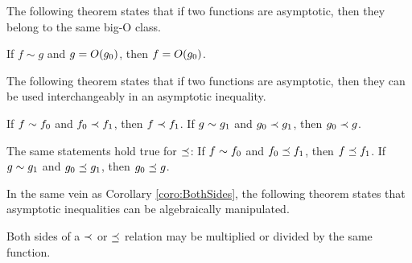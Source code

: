 The following theorem states that if two functions are asymptotic, then they belong to the same big-O class.

\begin{theorem}
\label{thm:SameBigOClass}
	If $f \sim g$ and $g = O(g_0)$, then $f = O(g_0)$.
\end{theorem}

The following theorem states that if two functions are asymptotic, then they can be used interchangeably in an asymptotic inequality.

\begin{theorem}
\label{thm:InterchangeableInInequality}
	If $f \sim f_0$ and $f_0 \prec f_1$, then $f \prec f_1$. If $g \sim g_1$ and $g_0 \prec g_1$, then $g_0 \prec g$.
\end{theorem}

\begin{corollary}
\label{coro:InterchangeableInNonStrictInequality}
	The same statements hold true for $\preceq$: If $f \sim f_0$ and $f_0 \preceq f_1$, then $f \preceq f_1$. If $g \sim g_1$ and $g_0 \preceq g_1$, then $g_0 \preceq g$.
\end{corollary}

In the same vein as Corollary \ref{coro:BothSides}, the following theorem states that asymptotic inequalities can be algebraically manipulated.

\begin{theorem}
\label{thm:BothSidesInequality}
	Both sides of a $\prec$ or $\preceq$ relation may be multiplied or divided by the same function.
\end{theorem}